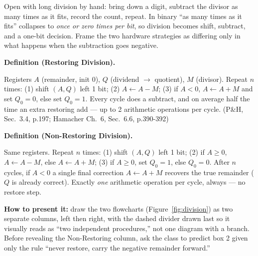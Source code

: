 \documentclass[11pt]{article}
\newenvironment{definitionbox}[1]{%
  \par\noindent\textbf{Definition (#1).}\ \itshape
}{\par\vspace{0.3em}}
\begin{document}
Open with long division by hand: bring down a digit, subtract the divisor as many times as it fits, record the count, repeat. In binary ``as many times as it fits'' collapses to \emph{once or zero times per bit}, so division becomes shift, subtract, and a one-bit decision. Frame the two hardware strategies as differing only in what happens when the subtraction goes negative.

\begin{definitionbox}{Restoring Division}
Registers $A$ (remainder, init 0), $Q$ (dividend $\to$ quotient), $M$ (divisor). Repeat $n$ times: (1) shift $(A,Q)$ left 1 bit; (2) $A \gets A-M$; (3) if $A<0$,  $A \gets A+M$ and set $Q_0=0$, else set $Q_0=1$. Every cycle does a subtract, and on average half the time an extra restoring add --- up to 2 arithmetic operations per cycle. (P\&H, Sec.~3.4, p.197; Hamacher Ch.~6, Sec.~6.6, p.390-392) \cite{PattersonHennessy2017_computer_organization_design,Hamacher2002_computer_organization}
\end{definitionbox}

\begin{definitionbox}{Non-Restoring Division}
Same registers. Repeat $n$ times: (1) shift $(A,Q)$ left 1 bit; (2) if $A\ge0$, $A\gets A-M$, else $A\gets A+M$; (3) if $A\ge0$, set $Q_0=1$, else $Q_0=0$. After $n$ cycles, if $A<0$ a single final correction $A\gets A+M$ recovers the true remainder ($Q$ is already correct). Exactly \emph{one} arithmetic operation per cycle, always --- no restore step.
\end{definitionbox}

\textbf{How to present it:} draw the two flowcharts (Figure~\ref{fig:division}) as two separate columns, left then right, with the dashed divider drawn last so it visually reads as ``two independent procedures,'' not one diagram with a branch. Before revealing the Non-Restoring column, ask the class to predict box 2 given only the rule ``never restore, carry the negative remainder forward.''
\end{document}
